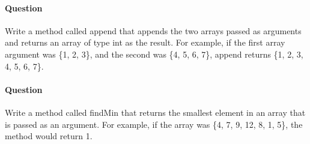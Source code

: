 \documentclass{article}
\begin{document}
\addtocounter{question_num}{1}
\paragraph{Question }
Write a method called append that appends the two arrays passed as arguments and returns an array of type int as the result. For example, if the first array argument was \{1, 2, 3\}, and the second was \{4, 5, 6, 7\}, append returns \{1, 2, 3, 4, 5, 6, 7\}.

\addtocounter{question_num}{1}
\paragraph{Question }
Write a method called findMin that returns the smallest element in an array that is passed as an argument. For example, if the array was \{4, 7, 9, 12, 8, 1, 5\}, the method would return 1.
\end{document}
